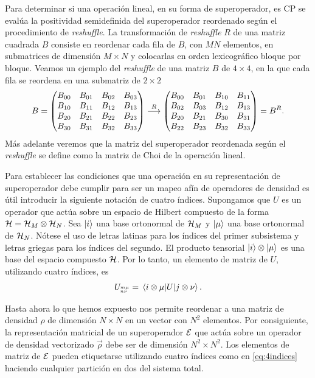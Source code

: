 Para determinar si una operación lineal, en su forma de superoperador, es CP 
se evalúa la positividad semidefinida del superoperador
reordenado según el procedimiento de \textit{reshuffle}.
La transformación de \textit{reshuffle} $R$ de una matriz cuadrada $B$ 
consiste en reordenar cada fila de $B$, con $MN$ elementos, 
en submatrices de dimensión $M\times N$ y colocarlas en 
orden lexicográfico bloque por bloque. Veamos un ejemplo del 
\textit{reshuffle} de una matriz $B$ de $4\times 4$, en la que 
cada fila se reordena en una submatriz de $2\times 2$
\begin{align}
B=
\mqty(
B_{00}&B_{01}&B_{02}&B_{03}\\
B_{10}&B_{11}&B_{12}&B_{13}\\
B_{20}&B_{21}&B_{22}&B_{23}\\
B_{30}&B_{31}&B_{32}&B_{33})
\stackrel{R}{\longrightarrow}
\mqty(
B_{00}&B_{01}&B_{10}&B_{11}\\
B_{02}&B_{03}&B_{12}&B_{13}\\
B_{20}&B_{21}&B_{30}&B_{31}\\
B_{22}&B_{23}&B_{32}&B_{33})
=B^R.
\label{eq:reshuffle}
\end{align}
Más adelante veremos que la matriz del superoperador 
reordenada según el \textit{reshuffle} se define como la matriz de Choi
de la operación lineal.

Para establecer las condiciones que una operación en su
representación de superoperador debe cumplir para ser un mapeo afín de
operadores de densidad es útil introducir la siguiente notación de cuatro índices. 
Supongamos que $U$ es un operador que actúa sobre un espacio de Hilbert 
compuesto de la forma $\mathcal{H}=\mathcal{H}_M\otimes\mathcal{H}_N$.
Sea $\ket{i}$ una base ortonormal de $\mathcal{H}_M$ y $\ket{\mu}$ una base
ortonormal de $\mathcal{H}_N$. Nótese el uso de letras latinas para los índices del
primer subsistema y letras griegas para los índices del segundo.
El producto tensorial $\ket{i}\otimes\ket{\mu}$
es una base del espacio compuesto $\mathcal{H}$. Por lo tanto, un 
elemento de matriz de $U$, utilizando cuatro índices, es
\begin{align}
U_\ind{m\mu}{n\nu}=\matrixel{i\otimes \mu}{U}{j\otimes \nu}.
\label{eq:4indices}
\end{align}

Hasta ahora lo que hemos expuesto nos permite reordenar a una matriz
de densidad $\rho$ de dimensión $N\times N$ en un vector con $N^2$ 
elementos. Por consiguiente, la representación matricial de un 
superoperador $\mathcal{E}$ que actúa sobre un operador de densidad vectorizado $\vec{\rho}$ 
debe ser de dimensión $N^2\times N^2$. Los elementos de matriz de
$\mathcal{E}$ pueden etiquetarse utilizando cuatro índices como en \eqref{eq:4indices}
haciendo cualquier partición en dos del sistema total.

